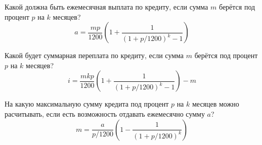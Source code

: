 \begin{zztask}
Какой должна быть ежемесячная выплата по кредиту, если сумма $m$ берётся 
под процент $p$ на $k$ месяцев?
%
\[
a = \frac{mp}{1200}\left(1 + \frac{1}{(1 + p/1200)^k - 1}\right)
\]
\end{zztask}


\begin{zztask}
Какой будет суммарная переплата по кредиту, если сумма $m$ берётся
под процент $p$ на $k$ месяцев?
%
\[
i = \frac{mkp}{1200}\left(1 + \frac{1}{(1 + p/1200)^k - 1}\right) - m
\]
\end{zztask}


\begin{zztask}
На какую максимальную сумму кредита под процент $p$ на $k$ месяцев
можно расчитывать, если есть возможность отдавать ежемесячно сумму $a$?
%
\[
m = \frac{a}{p/1200}\left(1 - \frac{1}{(1 + p/1200)^k}\right)
\]
\end{zztask}


